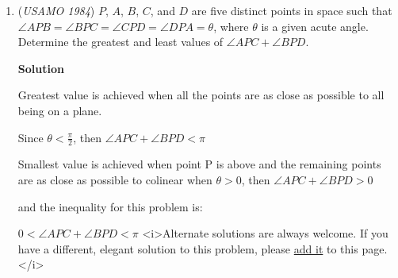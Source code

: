 \begin{enumerate}
 Now take some integer $b$ in $S$, not part of the other $q-1$ values. Together, their product must be a $q$th power, meaning $q|v_p(a_1a_2...a_{q-1}b)$ Thus, $v_p(a_1a_2...a_{q-1}b) \equiv 0 \pmod q$. It can be seen easily that for two positive integers $x$ and $y$ we have $v_p(ab) = v_p(a) + v_p(b)$, and by definition $v_p(a_i) \equiv r \pmod q$, so we can write $v_p(b) + (q-1)r \equiv 0 \pmod q$. Adding $r$ to both sides we have $v_p(b) \equiv v_p(b) + qr \equiv r \pmod q$.

 The choice of $b$ was arbitrary, meaning for all numbers $n$ in $S$, $v_p(n)$ modulo $q$ is the constant $r$, whether part of $a_1, a_2... a_{q-1}$ or not. The choice of $q$ was also arbitrary, thus for two integers $m$ and $n$ in $S$, $v_p(m) = v_p(n)$. Otherwise, we could pick $q$ larger than both values, and get a contradiction. Thus for all  numbers $n$ in $S$, $v_p(n)$ is constant. The choice of $p$ was also arbitrary, meaning any two distinct numbers in $S$ have the same prime factorization. By the fundamental theorem of arithmetic, this means the two numbers are the same, contradicting with them being distinct. Thus, no such $S$ exists.

 -Circling

 


	\item (\textit{USAMO 1984}) $P$, $A$, $B$, $C$, and $D$ are five distinct points in space such that $\angle APB = \angle BPC = \angle CPD = \angle DPA = \theta$, where $\theta$ is a given acute angle. Determine the greatest and least values of $\angle APC + \angle BPD$.


 



\textbf{Solution}

Greatest value is achieved when all the points are as close as possible to all being on a plane.

 Since $\theta < \frac{\pi}{2}$, then $\angle APC + \angle BPD < \pi$

 Smallest value is achieved when point P is above and the remaining points are as close as possible to colinear when $\theta > 0$, then $\angle APC + \angle BPD > 0$

 and the inequality for this problem is:

 $0 < \angle APC + \angle BPD < \pi$
<i>Alternate solutions are always welcome. If you have a different, elegant solution to this problem, please \href{https://artofproblemsolving.com/wiki/index.php?title=1984\_USAMO\_Problems/Problem\_3&action=edit}{add it} to this page.</i>




\end{enumerate}
